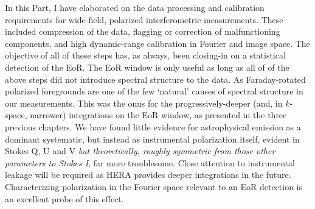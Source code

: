 In this Part, I have elaborated on the data processing and calibration requirements for wide-field, polarized interferometric measurements. These included compression of the data, flagging or correction of malfunctioning components, and high dynamic-range calibration in Fourier and image space. The objective of all of these steps has, as always, been closing-in on a statistical detection of the EoR. The EoR window is only useful as long as all of of the above steps did not introduce spectral structure to the data. As Faraday-rotated polarized foregrounds are one of the few `natural' causes of spectral structure in our measurements. This was the onus for the progressively-deeper (and, in $k$-space, narrower) integrations on the EoR window, as presented in the three previous chapters. We have found little evidence for astrophysical emission as a dominant systematic, but instead as instrumental polarization itself, evident in Stokes Q, U and V \textit{but theoretically, roughly symmetric from those other parameters to Stokes I}, far more troublesome. Close attention to instrumental leakage will be required as HERA provides deeper integrations in the future. Characterizing polarization in the Fourier space relevant to an EoR detection is an excellent probe of this effect. 